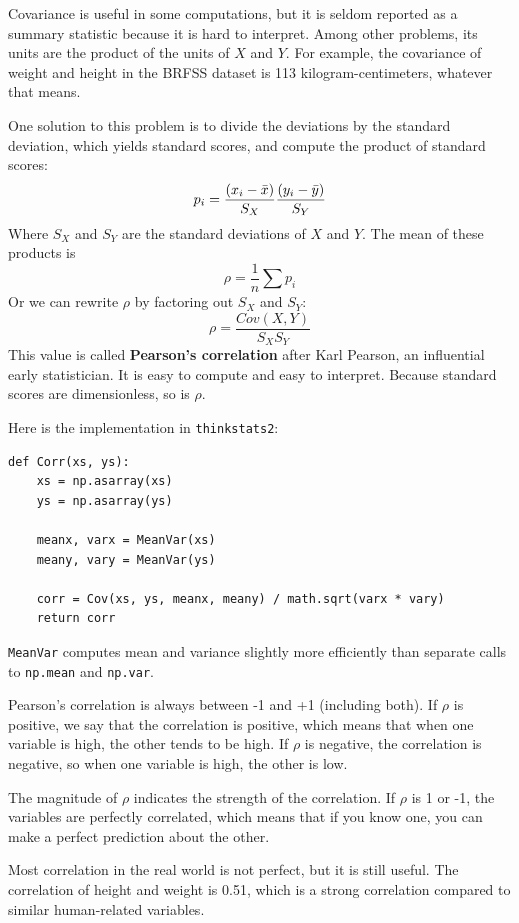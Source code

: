 \documentclass[12pt]{book}
\begin{document}
Covariance is useful in some computations, but it is seldom reported
as a summary statistic because it is hard to interpret.  Among other
problems, its units are the product of the units of $X$ and $Y$.  For
example, the covariance of weight and height in the BRFSS dataset is
113 kilogram-centimeters, whatever that means.

One solution to this problem is to divide the deviations by the standard
deviation, which yields standard scores, and compute the product of
standard scores:
%
\[ p_i = \frac{(x_i - \bar{x})}{S_X} \frac{(y_i - \bar{y})}{S_Y} \]
%
Where $S_X$ and $S_Y$ are the standard deviations of $X$ and $Y$.
The mean of these products is 
%
\[ \rho = \frac{1}{n} \sum p_i \]
%
Or we can rewrite $\rho$ by factoring out $S_X$ and
$S_Y$:
%
\[ \rho = \frac{Cov(X,Y)}{S_X S_Y} \]
%
This value is called {\bf Pearson's correlation} after Karl Pearson,
an influential early statistician.  It is easy to compute and easy to
interpret.  Because standard scores are dimensionless, so is $\rho$.

Here is the implementation in {\tt thinkstats2}:

\begin{verbatim}
def Corr(xs, ys):
    xs = np.asarray(xs)
    ys = np.asarray(ys)

    meanx, varx = MeanVar(xs)
    meany, vary = MeanVar(ys)

    corr = Cov(xs, ys, meanx, meany) / math.sqrt(varx * vary)
    return corr
\end{verbatim}

{\tt MeanVar} computes mean and variance slightly more efficiently
than separate calls to {\tt np.mean} and {\tt np.var}.

Pearson's correlation is always between -1 and +1 (including both).
If $\rho$ is positive, we say that the correlation is positive,
which means that when one variable is high, the other tends to be
high.  If $\rho$ is negative, the correlation is negative, so
when one variable is high, the other is low.

The magnitude of $\rho$ indicates the strength of the correlation.  If
$\rho$ is 1 or -1, the variables are perfectly correlated, which means
that if you know one, you can make a perfect prediction about the
other.  

Most correlation in the real world is not perfect, but it is still
useful.  The correlation of height and weight is 0.51, which is a
strong correlation compared to similar human-related variables.
\end{document}
